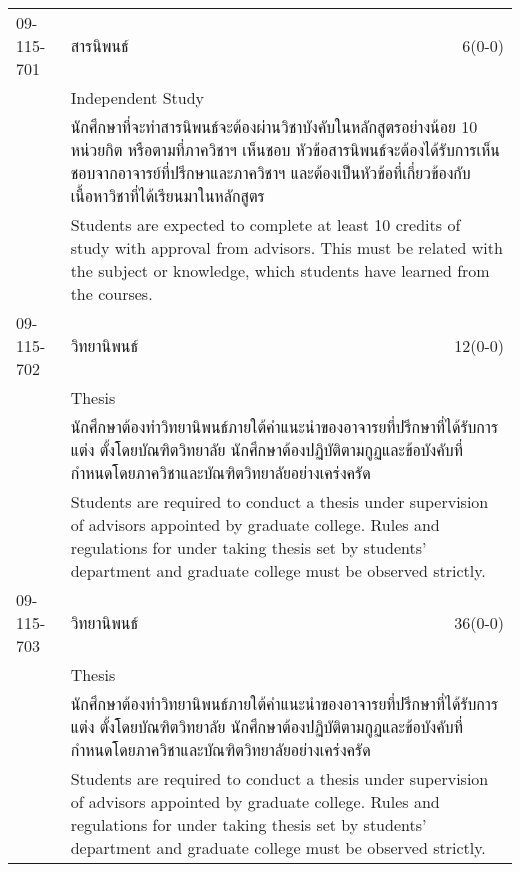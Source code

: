 \begin{longtable}{p{}p{}r{}}
09-115-701 & สารนิพนธ์ & 6(0-0)\\*
 & Independent Study & \phantom{x} \vspace{3mm} \\*
&  \multicolumn{2}{p{0.75\textwidth}}{นักศึกษาที่จะทำสารนิพนธ์จะต้องผ่านวิชาบังคับในหลักสูตรอย่างน้อย 10 หน่วยกิต หรือตามที่ภาควิชาฯ เห็นชอบ หัวข้อสารนิพนธ์จะต้องได้รับการเห็นชอบจากอาจารย์ที่ปรึกษาและภาควิชาฯ และต้องเป็นหัวข้อที่เกี่ยวข้องกับเนื้อหาวิชาที่ได้เรียนมาในหลักสูตร } \vspace{3mm} \\*
&  \multicolumn{2}{p{0.75\textwidth}}{Students are expected to complete at least 10 credits of study with approval from advisors. This must be related with the subject or knowledge, which students have learned from the courses.} \vspace{8mm} \\*
09-115-702 & วิทยานิพนธ์ & 12(0-0)\\*
 & Thesis & \phantom{x} \vspace{3mm} \\*
&  \multicolumn{2}{p{0.75\textwidth}}{นักศึกษาต้องทำวิทยานิพนธ์ภายใต้คำแนะนำของอาจารยที่ปรึกษาที่ได้รับการแต่ง ตั้งโดยบัณฑิตวิทยาลัย นักศึกษาต้องปฏิบัติตามกูฏและข้อบังคับที่กำหนดโดยภาควิชาและบัณฑิตวิทยาลัยอย่างเคร่งครัด} \vspace{3mm} \\*
&  \multicolumn{2}{p{0.75\textwidth}}{Students are required to conduct a thesis under supervision of advisors appointed by graduate college. Rules and regulations for under taking thesis set by students’ department and graduate college must be observed strictly.} \vspace{8mm} \\*
09-115-703 & วิทยานิพนธ์ & 36(0-0)\\*
 & Thesis & \phantom{x} \vspace{3mm} \\*
&  \multicolumn{2}{p{0.75\textwidth}}{นักศึกษาต้องทำวิทยานิพนธ์ภายใต้คำแนะนำของอาจารยที่ปรึกษาที่ได้รับการแต่ง ตั้งโดยบัณฑิตวิทยาลัย นักศึกษาต้องปฏิบัติตามกูฏและข้อบังคับที่กำหนดโดยภาควิชาและบัณฑิตวิทยาลัยอย่างเคร่งครัด} \vspace{3mm} \\*
&  \multicolumn{2}{p{0.75\textwidth}}{Students are required to conduct a thesis under supervision of advisors appointed by graduate college. Rules and regulations for under taking thesis set by students’ department and graduate college must be observed strictly.} \vspace{8mm} \\*
\end{longtable}
